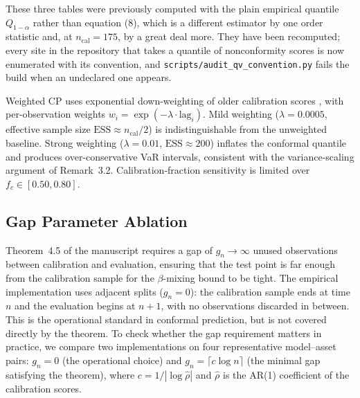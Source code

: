 \documentclass[preprint,11pt,authoryear]{elsarticle}
\newcommand{\1}{\boldsymbol{1}}
\begin{document}
These three tables were previously computed with the plain empirical quantile
$Q_{1-\alpha}$ rather than equation (8), which is a different estimator by one
order statistic and, at $n_{\mathrm{cal}} = 175$, by a great deal more. They have
been recomputed; every site in the repository that takes a quantile of
nonconformity scores is now enumerated with its convention, and
\texttt{scripts/audit\_qv\_convention.py} fails the build when an undeclared one
appears.

\begin{table}[htbp]
	\centering
	\caption{Robustness summary (Chronos-Small, 24 assets,
		$\alpha = 0.01$).}
	\label{tab:robustness}
	\scriptsize
	
	\begin{minipage}{\linewidth}\footnotesize
		\smallskip
		Weighted CP uses exponential down-weighting of older calibration
		scores \citep{barber2023conformal}, with per-observation weights
		$w_i=\exp(-\lambda\cdot\mathrm{lag}_i)$. Mild weighting
		($\lambda=0.0005$, effective sample size $\mathrm{ESS}\approx n_{\mathrm{cal}}/2$) is
		indistinguishable from the unweighted baseline. Strong weighting
		($\lambda=0.01$, $\mathrm{ESS}\approx200$) inflates the conformal
		quantile and produces over-conservative VaR intervals, consistent
		with the variance-scaling argument of
		Remark~3.2. Calibration-fraction sensitivity is
		limited over $f_c\in[0.50,0.80]$.
	\end{minipage}
\end{table}









\subsection{Gap Parameter Ablation}
\label{app:gap_ablation}

Theorem~4.5 of the manuscript requires a gap of
$g_n \to \infty$ unused observations between calibration and
evaluation, ensuring that the test point is far enough from the
calibration sample for the $\beta$-mixing bound to be tight. The
empirical implementation uses adjacent splits ($g_n = 0$): the
calibration sample ends at time $n$ and the evaluation begins at
$n+1$, with no observations discarded in between. This is the
operational standard in conformal prediction, but is not covered
directly by the theorem. To check whether the gap requirement
matters in practice, we compare two implementations on four
representative model--asset pairs: $g_n = 0$ (the operational
choice) and $g_n = \lceil c \log n \rceil$ (the minimal gap
satisfying the theorem), where $c = 1/|\log \hat\rho|$ and
$\hat\rho$ is the AR(1) coefficient of the calibration scores.
\end{document}
